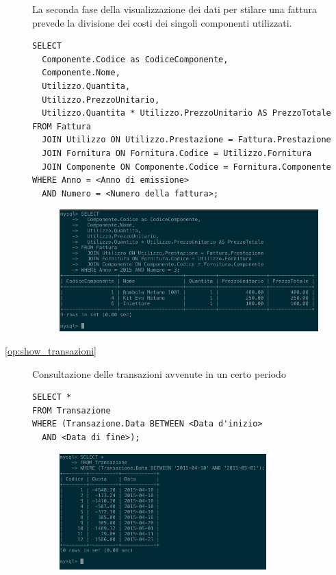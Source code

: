 \begin{description}
              La seconda fase della visualizzazione dei dati per stilare una fattura prevede la divisione dei costi dei singoli componenti utilizzati.

              \begin{lstlisting}
SELECT
  Componente.Codice as CodiceComponente,
  Componente.Nome,
  Utilizzo.Quantita,
  Utilizzo.PrezzoUnitario,
  Utilizzo.Quantita * Utilizzo.PrezzoUnitario AS PrezzoTotale
FROM Fattura
  JOIN Utilizzo ON Utilizzo.Prestazione = Fattura.Prestazione
  JOIN Fornitura ON Fornitura.Codice = Utilizzo.Fornitura
  JOIN Componente ON Componente.Codice = Fornitura.Componente
WHERE Anno = <Anno di emissione> 
  AND Numero = <Numero della fattura>;
              \end{lstlisting}

              \begin{figure}[H]
                \centering
                \includegraphics[width=10cm]{images/screenshots/show_componenti_fattura.png}
              \end{figure}

            \item[\ref{op:show_transazioni}] Consultazione delle transazioni avvenute in un certo periodo

              \begin{lstlisting}
SELECT *
FROM Transazione
WHERE (Transazione.Data BETWEEN <Data d'inizio>
  AND <Data di fine>);
              \end{lstlisting}

              \begin{figure}[H]
                \centering
                \includegraphics[width=8cm]{images/screenshots/show_transazioni.png}
              \end{figure}


\end{description}
